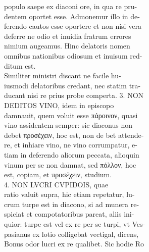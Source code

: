 \documentclass{article}
\begin{document}
\begin{pages}
                populo saepe ex diaconi ore, in qua re pru- \\
                dentem oportet esse. Admonemur illo in de- \\
                ferendo cautos esse oportere et non nisi vera \\
                deferre ne odio et inuidia fratrum errores \\
                nimium augeamus. Hinc delatoris nomen \\
                omnibus nationibus odiosum et inuisum red- \\
                ditum est. \\
                Similiter ministri discant ne facile hu- \\
                iusmodi delatoribus credant, nec statim tra- \\
                ducant nisi re prius probe comperta. 3. NON \\
                DEDITOS VINO, idem in episcopo \\
                damnauit, quem voluit esse πάροινον, quasi \\
                vino assidentem semper: sic diaconus non \\
                debet προσέχειν, hoc est, non de bet attende- \\
                re, et inhiare vino, ne vino corrumpatur, e- \\
                tiam in deferendo aliorum peccata, alioquin \\
                vinum per se non damnat, sed πόλλον, hoc \\
                est, copiam, et προσέχειν, studium. \\
                4. NON LVCRI CVPIDOIS, quae \\
                ratio valuit supra, hic etiam repetatur, lu- \\
                crum turpe est in diacono, si ad munera re- \\
                spiciat et compotatoribus pareat, aliis ini- \\
                quior: turpe est vel ex re per se turpi, vt Ves- \\
                pasianus ex lotio colligebat vectigal, dicens, \\
                Bonus odor lucri ex re qualibet. Sic hodie Ro \\

\end{pages}
\end{document}
